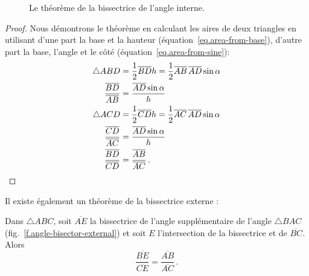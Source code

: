 \begin{figure}[htbp]
\centering

\caption{Le théorème de la bissectrice de l'angle interne.}\label{f.angle-bisector}
\end{figure}
\begin{proof}
Nous démontrons le théorème en calculant les aires de deux triangles en utilisant d'une part  la base et la hauteur (équation~\ref{eq.area-from-base}), d'autre part la base, l'angle et le côté (équation~\ref{eq.area-from-sine}):
\begin{align*}
\triangle ABD&=\frac{1}{2}\overline{BD}h=\frac{1}{2}\overline{AB}\,\overline{AD}\sin \alpha\\
\frac{\overline{BD}}{\overline{AB}}&=\frac{\overline{AD}\sin \alpha}{h}\\
\triangle ACD&=\frac{1}{2}\overline{CD}h=\frac{1}{2}\overline{AC}\,\overline{AD}\sin \alpha\\
\frac{\overline{CD}}{\overline{AC}}&=\frac{\overline{AD}\sin \alpha}{h}\\
\frac{\overline{BD}}{\overline{CD}}&=\frac{\overline{AB}}{\overline{AC}}\,.\qedhere
\end{align*}
\end{proof}

Il existe également un théorème de la bissectrice externe :
\begin{theorem}\label{thm.external-angle-bisector}
Dans $\triangle ABC$, soit $\overline{AE}$ la bissectrice de l'angle supplémentaire de l'angle $\triangle BAC$ (fig.~\ref{f.angle-bisector-external}) et soit $E$ l'intersection de la bissectrice et de $\overline{BC}$. Alors 
\[
\frac {\overline{BE}}{\overline{CE}}=\frac {\overline{AB}}{\overline{AC}}\,.
\]
\end{theorem}

